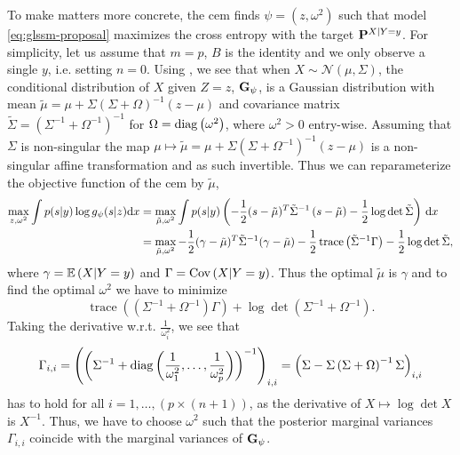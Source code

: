 To make matters more concrete, the \gls{cem} finds $\psi = (z, \omega^{2})$ such that model \eqref{eq:glssm-proposal} maximizes the cross entropy with the target $\P^{X|Y=y}$. For simplicity, let us assume that $m = p$, $B$ is the identity and we only observe a single $y$, i.e. setting $n=0$. Using , we see that when $X\sim\mathcal N(\mu, \Sigma)$, the conditional distribution of $X$ given $Z=z$, $\G_{\psi}$, is a Gaussian distribution with mean $\tilde \mu =  \mu + \Sigma \left( \Sigma  + \Omega \right)^{-1} \left( z - \mu \right)$  and covariance matrix $\tilde\Sigma = \left( \Sigma ^{-1} + \Omega^{-1}\right)^{-1}$ for $\Omega = \diag \left( \omega^{2} \right)$, where $\omega^{2} > 0$ entry-wise. Assuming that $\Sigma$ is non-singular the map $\mu \mapsto \tilde \mu = \mu + \Sigma \left( \Sigma + \Omega^{-1} \right)^{-1} \left( z - \mu \right)$ is a non-singular affine transformation and as such invertible. Thus we can reparameterize the objective function of the \gls{cem} by $\tilde \mu$,
\begin{align}
    \label{eq:cem_reparametrization}
    \begin{split}
    \max_{z, \omega^{2}} \int p(s|y) \log g_{\psi}(s|z) \mathrm dx &= \max_{\tilde\mu, \omega^{2}} \int p(s|y) \left( - \frac{1}{2} (s - \tilde \mu)^{T} \tilde \Sigma ^{-1} \left( s - \tilde \mu \right)  - \frac{1}{2} \log\det \tilde \Sigma \right)  \d x\\
&= \max_{\tilde \mu, \omega^{2}} - \frac{1}{2} (\gamma - \tilde \mu)^{T}\tilde \Sigma ^{-1} ( \gamma - \tilde \mu) - \frac{1}{2} \operatorname{trace} \left( \tilde \Sigma^{-1} \Gamma \right) - \frac{1}{2} \log\det\tilde\Sigma,
    \end{split}
\end{align}
where $\gamma = \E \left( X | Y = y \right)$ and $\Gamma = \cov \left( X | Y = y \right)$. 
Thus the optimal $\tilde \mu$ is $\gamma$ and to find the optimal $\omega^{2}$ we have to minimize 
$$
\operatorname{trace} \left( \left( \Sigma^{-1} + \Omega^{-1} \right) \Gamma \right) + \log\det \left( \Sigma^{-1} + \Omega^{-1} \right).
$$
Taking the derivative w.r.t. $\frac{1}{\omega_{i}^{2}}$, we see that 
\begin{align}
\label{eq:gamma_post}
\Gamma_{i,i} = \left(\left( \Sigma^{-1} + \diag \left( \frac{1}{\omega^{2}_{1}}, \dots, \frac{1}{\omega^{2}_{p}}\right) \right)^{-1}\right)_{i,i} = \left( \Sigma - \Sigma \left( \Sigma + \Omega \right)^{-1}\Sigma \right)_{i,i} %
\end{align}
has to hold for all $i = 1, \dots, (p \times (n + 1))$, as the derivative of $X \mapsto \log\det X$ is $X^{-1}$. Thus, we have to choose $\omega^{2}$ such that the posterior marginal variances $\Gamma_{i,i}$ coincide with the marginal variances of $\G_{\psi}$.

